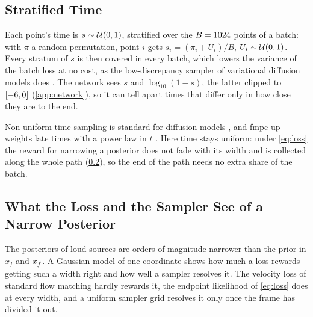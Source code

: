 \subsection{Stratified Time}
\label{app:fm-clock}

Each point's time is $s\sim\mathcal{U}(0,1)$, stratified over the $B=1024{}$ points of a
batch: with $\pi$ a random permutation, point $i$ gets $s_i = (\pi_i + U_i)/B$,
$U_i\sim\mathcal{U}(0,1)$. Every stratum of $s$ is then covered in every batch, which lowers the
variance of the batch loss at no cost, as the low-discrepancy sampler of variational diffusion
models does \citep{kingma2021variational}. The network sees $s$ and $\log_{10}(1-s)$, the latter
clipped to $[-6{},0]$ (\cref{app:network}), so it can tell apart times that
differ only in how close they are to the end.

Non-uniform time sampling is standard for diffusion models
\citep{karras2022elucidating,kingma2023understanding,esser2024scaling}, and \ac{fmpe} up-weights late
times with a power law in $t$ \citep[Sec.~3.3]{dax2023flow}. Here time stays uniform: under
\cref{eq:loss} the reward for narrowing a posterior does not fade with its width and is collected
along the whole path (\cref{app:fm-sensitivity}), so the end of the path needs no extra share of
the batch.

\subsection{What the Loss and the Sampler See of a Narrow Posterior}
\label{app:fm-sensitivity}

The posteriors of loud sources are orders of magnitude narrower than the prior in $x_f$ and
$x_{\dot f}$. A Gaussian model of one coordinate shows how much a loss rewards getting such a width
right and how well a sampler resolves it. The velocity loss of standard flow matching hardly
rewards it, the endpoint likelihood of \cref{eq:loss} does at every width, and a uniform sampler
grid resolves it only once the frame has divided it out.

